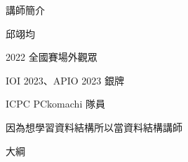 \begin{frame}
    \titlepage
\end{frame}

\begin{frame}{講師簡介}
    \begin{itemize}
        \item 邱翊均
        \item 2022 全國賽場外觀眾
        \item IOI 2023、APIO 2023 銀牌
        \item ICPC PCkomachi 隊員
         {
            \item 因為想學習資料結構所以當資料結構講師
        }
    \end{itemize}
\end{frame}

\begin{frame}{大綱}
    \tableofcontents
\end{frame}
